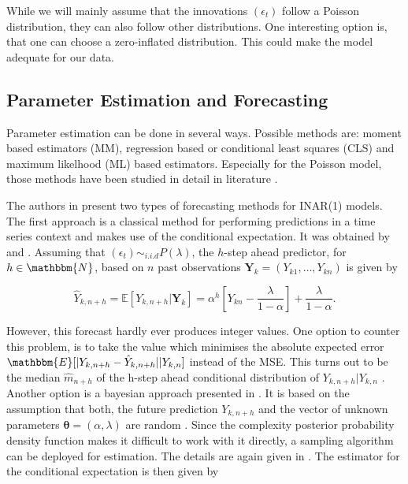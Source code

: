 While we will mainly assume that the innovations $(\epsilon_t)$ follow a Poisson distribution, they can also follow other distributions. One interesting option is, that one can choose a zero-inflated distribution. This could make the model adequate for our data. 


\subsection{Parameter Estimation and Forecasting}
\label{sec: Inar Parameter Estimation and Forecasting}

Parameter estimation can be done in several ways. Possible methods are: moment based estimators (MM), regression based or conditional least squares (CLS) and maximum likelhood (ML) based estimators. Especially for the Poisson model, those methods have been studied in detail in literature \cite{Silva:2005}. 

The authors in \cite{Silva:2005} present two types of forecasting methods for INAR(1) models. The first approach is a classical method for performing predictions in a time series context and makes use of the conditional expectation. It was obtained by \cite{Bre:1993} and \cite{Freeland:2004}. Assuming that $(\epsilon_t) \sim_{i.i.d} P(\lambda)$, the $h$-step ahead predictor, for $h\in \mathbbm{N}$, based on $n$ past observations $\bm{Y}_k=(Y_{k1},\ldots,Y_{kn})$ is given by

\begin{equation}
\hat{Y}_{k,n+h} = \mathbb{E}[Y_{k,n+h} | \bm{Y}_k] = \alpha^h \left[Y_{kn}- \frac{\lambda}{1-\alpha} \right] + \frac{\lambda}{1-\alpha}.
\label{eq:Forecasting Classic}
\end{equation}


However, this forecast hardly ever produces integer values. One option to counter this problem, is to take the value which minimises the absolute expected error $\mathbbm{E}[\abs{Y_{k,n+h} - \hat{Y}_{k,n+h}}|Y_{k,n}]$ instead of the MSE. This turns out to be the median $\hat{m}_{n+h}$ of the h-step ahead conditional distribution of $Y_{k,n+h}|Y_{k,n}$ \cite{Silva:2005,Freeland:2004}. Another option is a bayesian approach presented in \cite{Silva:2005}. It is based on the assumption that both, the future prediction $Y_{k,n+h}$ and the vector of unknown parameters $\bm{\theta}=(\alpha,\lambda)$ are random \cite{Silva:2005}. Since the complexity posterior probability density function makes it difficult to work with it directly, a sampling algorithm can be deployed for estimation. The details are again given in \cite{Silva:2005}. The estimator for the conditional expectation is then given by

